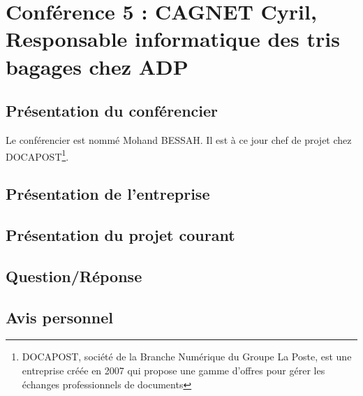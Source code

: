 \section{Conférence 5 : CAGNET Cyril, Responsable informatique des tris bagages chez ADP}
 	\subsection{Présentation du conférencier}
 Le conférencier est  nommé Mohand BESSAH. Il est à ce jour chef de projet chez DOCAPOST\footnote{DOCAPOST, société de la Branche Numérique du Groupe La Poste, est une entreprise créée en 2007 qui propose une gamme d’offres pour gérer les échanges professionnels de documents}. 
 	\subsection{Présentation de l'entreprise}
 	\subsection{Présentation du projet courant}
 	\subsection{Question/Réponse}
 	\subsection{Avis personnel} 